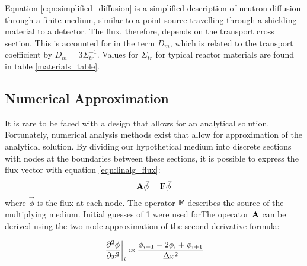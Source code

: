 \documentclass[../main.tex]{subfiles}
\begin{document}
	Equation \ref{eqn:simplified_diffusion} is a simplified description of neutron diffusion through a finite medium, similar to a point source travelling through a shielding material to a detector. The flux, therefore, depends on the transport cross section. This is accounted for in the term $D_m$, which is related to the transport coefficient by $D_m = 3 \Sigma_{tr}^{-1}$. Values for $\Sigma_{tr}$ for typical reactor materials are found in table \ref{materials_table}. 

	
\subsection{Numerical Approximation} \label{ssec:numerical}
	It is rare to be faced with a design that allows for an analytical solution. Fortunately, numerical analysis methods exist that allow for approximation of the analytical solution. By dividing our hypothetical medium into discrete sections with nodes at the boundaries between these sections, it is possible to express the flux vector with equation \ref{eqn:linalg_flux}:
	\begin{equation}
		\mathbf{A} \vec{\phi} = \mathbf{F} \vec{\phi}
		\label{eqn:linalg_flux}
	\end{equation}
	where $\vec{\phi}$ is the flux at each node. The operator $\mathbf{F}$ describes the source of the multiplying medium.  Initial guesses of 1 were used forThe operator $\mathbf{A}$ can be derived using the two-node approximation of the  second derivative formula:
	
	\begin{equation*}
		\left. \pdv[2]{\phi}{x} \right|_i \approx \frac{\phi_{i-1} - 2\phi_i + \phi_{i+1}}{\Delta x^2}
	\end{equation*}
\end{document}
